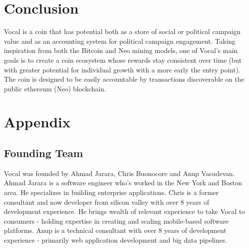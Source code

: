 \documentclass[conference]{IEEEtran}
\begin{document}
      
      
    
    \FloatBarrier
    \section{Conclusion}
   Vocal is a coin that has potential both as a store of social or political campaign value and as an accounting system for political campaign engagement. Taking inspiration from both the Bitcoin and Neo mining models, one of Vocal's main goals is to create a coin ecosystem whose rewards stay consistent over time (but with greater potential for individual growth with a more early the entry point). The coin is designed to be easily accountable by transactions discoverable on the public ethereum (Neo) blockchain.

    
    \section*{Appendix}

    \subsection{Founding Team}
   Vocal was founded by Ahmad Jarara, Chris Buonocore and Anup Vasudevan. Ahmad Jarara is a software engineer who's worked in the New York and Boston area. He specializes
   in building enterprise applications. Chris is a former consultant and now developer from silicon valley with over 8 years of development experience. He brings wealth of relevant
   experience to take Vocal to consumers - holding expertise in creating and scaling mobile-based software platforms. Anup is a technical consultant with over 8
   years of development experience - primarily web application development and big data pipelines.
\end{document}
